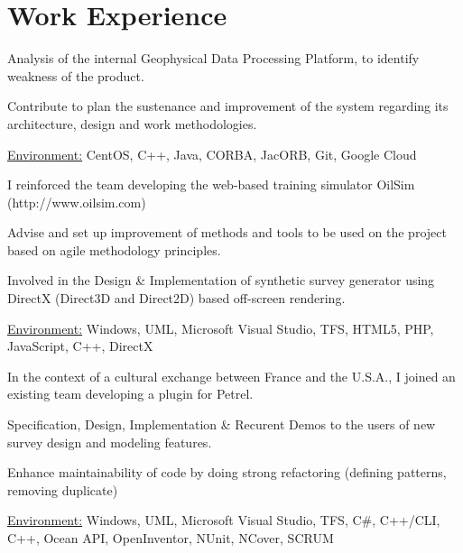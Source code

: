 \documentclass[10pt,letterpaper]{resume/resume}
\begin{document}
  \begin{minipage}[t]{\linewidth}
    \section{Work Experience}

\par Analysis of the internal Geophysical Data Processing Platform, to identify weakness of the product.
\par Contribute to plan the sustenance and improvement of the system regarding its architecture, design and work methodologies.
\par\underline{Environment:} CentOS, C++, Java, CORBA, JacORB, Git, Google Cloud

\par I reinforced the team developing the web-based training simulator OilSim (http://www.oilsim.com)
\par Advise and set up improvement of methods and tools to be used on the project based on agile methodology principles.
\par Involved in the Design \& Implementation of synthetic survey generator using DirectX (Direct3D and Direct2D) based off-screen rendering.
\par\underline{Environment:} Windows, UML, Microsoft Visual Studio, TFS, HTML5, PHP, JavaScript, C++, DirectX

\par In the context of a cultural exchange between France and the U.S.A., I joined an existing team developing a plugin for Petrel.
\par Specification, Design, Implementation \& Recurent Demos to the users of new survey design and modeling features.
\par Enhance maintainability of code by doing strong refactoring (defining patterns, removing duplicate)
\par\underline{Environment:} Windows, UML, Microsoft Visual Studio, TFS, C\#, C++/CLI, C++, Ocean API, OpenInventor, NUnit, NCover, SCRUM



\end{minipage}
\end{document}
